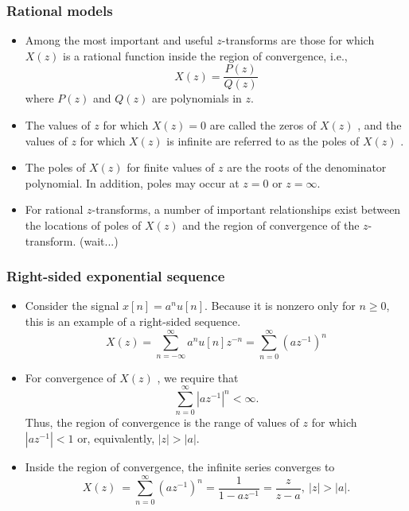 \begin{frame}
\frametitle{Rational models}
\begin{itemize}
\item Among the most important and useful $z$-transforms are those for which $X(z)$ is a rational function inside the region of convergence, i.e.,
$$
X(z)=\frac{P(z)}{Q(z)}
$$
where $P(z)$ and $Q(z)$ are polynomials in $z$. 
\item The values of $z$ for which $X(z)=0$ are called the \alert{zeros} of $X(z)$ , and the values of $z$ for which $X(z)$ is infinite are referred to as the \alert{poles} of $X(z)$ . 
\item The poles of $X(z)$ for finite values of $z$ are the roots of the denominator polynomial. In addition, poles may occur at $z=0$ or $ z=\infty$. 
\item For rational $z$-transforms, a number of important relationships exist between the locations of poles of $X(z)$ and the region of convergence of the $z$-transform. (\alert{wait...}) 
\end{itemize}
\end{frame}


\begin{frame}
\frametitle{Right-sided exponential sequence}
\begin{itemize}
\item Consider the signal $x[n]=a^{n}u[n]$. Because it is nonzero only for $n\geq 0$, this is an example of a \alert{right-sided} sequence. 
$$
X(z)=\sum_{n=-\infty}^{\infty} a^{n}u[n]z^{-n}=\sum_{n=0}^{\infty}(az^{-1})^{n}
$$
\item For convergence of $X(z)$ , we require that
$$
\sum_{n=0}^{\infty}|az^{-1}|^{n}<\infty.
$$
Thus, the region of convergence is the range of values of $z$ for which $|az^{-1}|<1$ or, equivalently, $|z|>|a|$. 
\item Inside the region of convergence, the infinite series converges to
$$
X(z)\ =\sum_{n=0}^{\infty}(az^{-1})^{n}=\frac{1}{1-az^{-1}}=\frac{z}{z-a},\ |z|>|a|.
$$
\end{itemize}
\end{frame}

